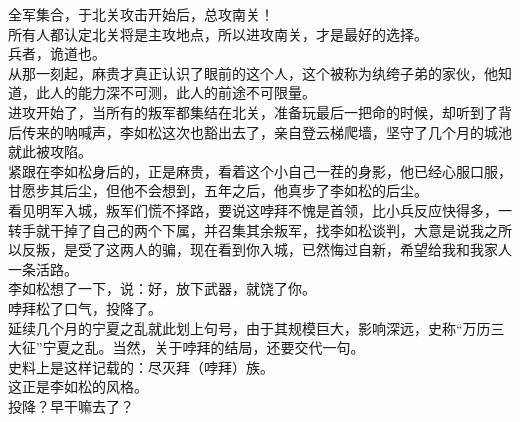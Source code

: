 \begin{multicols}{\theparacolNo}
全军集合，于北关攻击开始后，总攻南关！\\

所有人都认定北关将是主攻地点，所以进攻南关，才是最好的选择。\\

兵者，诡道也。\\

从那一刻起，麻贵才真正认识了眼前的这个人，这个被称为纨绔子弟的家伙，他知道，此人的能力深不可测，此人的前途不可限量。\\

进攻开始了，当所有的叛军都集结在北关，准备玩最后一把命的时候，却听到了背后传来的呐喊声，李如松这次也豁出去了，亲自登云梯爬墙，坚守了几个月的城池就此被攻陷。\\

紧跟在李如松身后的，正是麻贵，看着这个小自己一茬的身影，他已经心服口服，甘愿步其后尘，但他不会想到，五年之后，他真步了李如松的后尘。\\

看见明军入城，叛军们慌不择路，要说这哱拜不愧是首领，比小兵反应快得多，一转手就干掉了自己的两个下属，并召集其余叛军，找李如松谈判，大意是说我之所以反叛，是受了这两人的骗，现在看到你入城，已然悔过自新，希望给我和我家人一条活路。\\

李如松想了一下，说：好，放下武器，就饶了你。\\

哱拜松了口气，投降了。\\

延续几个月的宁夏之乱就此划上句号，由于其规模巨大，影响深远，史称“万历三大征”宁夏之乱。当然，关于哱拜的结局，还要交代一句。\\

史料上是这样记载的：尽灭拜（哱拜）族。\\

这正是李如松的风格。\\

投降？早干嘛去了？\\

\ifnum{}
	\end{multicols}
\fi
\newpage

